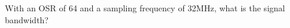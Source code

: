 \subsection{}

With an OSR of 64 and a sampling frequency of 32MHz, what is the signal bandwidth?


